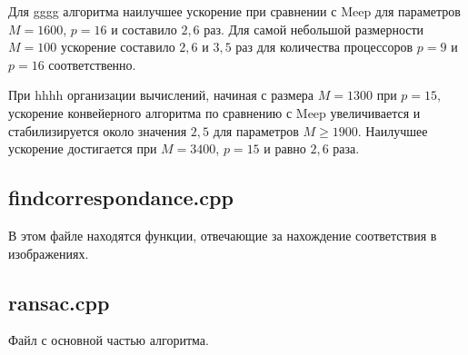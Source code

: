 \documentclass[14pt,a4paper]{extarticle} %
\begin{document}
Для gggg алгоритма наилучшее ускорение при сравнении с Meep для параметров $M=1600$, $p=16$ и составило $2,6$ раз. Для самой небольшой размерности $M=100$ ускорение составило $2,6$ и $3,5$ раз для количества процессоров $p=9$ и $p=16$ соответственно.

При hhhh организации вычислений, начиная с размера $M=1300$ при $p=15$, ускорение конвейерного алгоритма по сравнению с Meep увеличивается и стабилизируется около значения $2,5$ для параметров $M \geqslant 1900$. Наилучшее ускорение достигается при $M=3400$, $p=15$ и равно $2,6$ раза.






\label{apx:source-code}

\subsection*{findcorrespondance.cpp}
В этом файле находятся функции, отвечающие за нахождение соответствия в изображениях.


\subsection*{ransac.cpp}
Файл с основной частью алгоритма.

\end{document}
